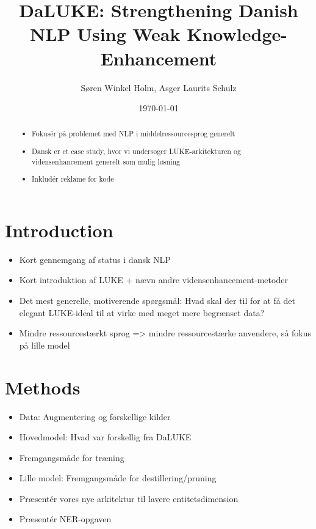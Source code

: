 \documentclass[12pt, fleqn]{article}
\title{DaLUKE: Strengthening Danish NLP Using Weak Knowledge-Enhancement}
\author{Søren Winkel Holm, Asger Laurits Schulz}
\date{\today}
\begin{document}
\setlength{\headheight}{15pt}
\addtolength{\topmargin}{-2.5pt}
\maketitle

\begin{abstract}
    \begin{itemize}
        \item Fokusér på problemet med NLP i middelressourcesprog generelt
        \item Dansk er et case study, hvor vi undersøger LUKE-arkitekturen og vidensenhancement generelt som mulig løsning
        \item Inkludér reklame for kode
    \end{itemize}
\end{abstract}
\section{Introduction}%
\label{sec:Introduction}
\begin{itemize}
    \item Kort gennemgang af status i dansk NLP
    \item Kort introduktion af LUKE + nævn andre vidensenhancement-metoder
    \item Det mest generelle, motiverende spørgsmål: Hvad skal der til for at få det elegant LUKE-ideal til at virke med meget mere begrænset data?
    \item Mindre ressourcestærkt sprog => mindre ressourcestærke anvendere, så fokus på lille model
\end{itemize}

\section{Methods}%
\label{sec:Methods}
\begin{itemize}
    \item Data: Augmentering og forskellige kilder
    \item Hovedmodel: Hvad var forskellig fra DaLUKE
    \item Fremgangsmåde for træning
    \item Lille model: Fremgangsmåde for destillering/pruning
    \item Præsentér vores nye arkitektur til lavere entitetsdimension
    \item Præsentér NER-opgaven
\end{itemize}
\end{document}
